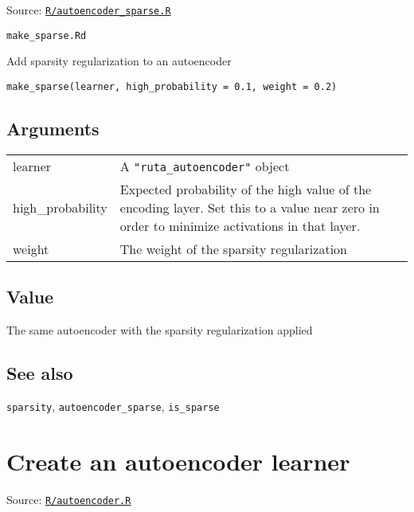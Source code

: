 Source:
\href{https://github.com/fdavidcl/ruta/blob/master/R/autoencoder_sparse.R}{\texttt{R/autoencoder\_sparse.R}}

\texttt{make\_sparse.Rd}

Add sparsity regularization to an autoencoder

\begin{verbatim}
make_sparse(learner, high_probability = 0.1, weight = 0.2)
\end{verbatim}

\hypertarget{arguments}{\subsection{\texorpdfstring{\protect\hyperlink{arguments}{}Arguments}{Arguments}}\label{arguments}}

\begin{longtable}[c]{@{}ll@{}}
\toprule
learner & A \texttt{"ruta\_autoencoder"} object\tabularnewline
high\_probability & Expected probability of the high value of the
encoding layer. Set this to a value near zero in order to minimize
activations in that layer.\tabularnewline
weight & The weight of the sparsity regularization\tabularnewline
\bottomrule
\end{longtable}

\hypertarget{value}{\subsection{\texorpdfstring{\protect\hyperlink{value}{}Value}{Value}}\label{value}}

The same autoencoder with the sparsity regularization applied

\hypertarget{see-also}{\subsection{\texorpdfstring{\protect\hyperlink{see-also}{}See
also}{See also}}\label{see-also}}

\texttt{sparsity}, \texttt{autoencoder\_sparse}, \texttt{is\_sparse}

\section{Create an autoencoder
learner}\label{create-an-autoencoder-learner-1}

Source:
\href{https://github.com/fdavidcl/ruta/blob/master/R/autoencoder.R}{\texttt{R/autoencoder.R}}

